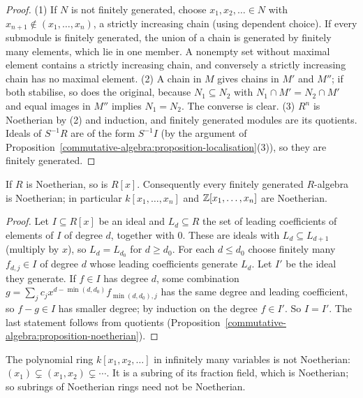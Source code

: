 \begin{proof}
(1) If $N$ is not finitely generated, choose $x_1, x_2, \ldots \in N$ with $x_{n+1} \notin (x_1, \ldots, x_n)$, a strictly
increasing chain (using dependent choice). If every submodule is finitely generated, the union of a chain is
generated by finitely many elements, which lie in one member. A nonempty set without maximal element contains a
strictly increasing chain, and conversely a strictly increasing chain has no maximal element.
(2) A chain in $M$ gives chains in $M'$ and $M''$; if both stabilise, so does the original, because
$N_1 \subseteq N_2$ with $N_1 \cap M' = N_2 \cap M'$ and equal images in $M''$ implies $N_1 = N_2$. The converse is clear.
(3) $R^n$ is Noetherian by (2) and induction, and finitely generated modules are its quotients. Ideals of
$S^{-1}R$ are of the form $S^{-1}I$ (by the argument of Proposition~\ref{commutative-algebra:proposition-localisation}(3)),
so they are finitely generated.
\end{proof}

\begin{theorem}\label{commutative-algebra:theorem-hilbert-basis}
If $R$ is Noetherian, so is $R[x]$. Consequently every finitely generated $R$-algebra is Noetherian; in particular
$k[x_1, \ldots, x_n]$ and $\mathbb{Z}[x_1, \ldots, x_n]$ are Noetherian.
\end{theorem}

\begin{proof}
Let $I \subseteq R[x]$ be an ideal and $L_d \subseteq R$ the set of leading coefficients of elements of $I$ of degree $d$, together
with $0$. These are ideals with $L_d \subseteq L_{d+1}$ (multiply by $x$), so $L_d = L_{d_0}$ for $d \geq d_0$. For each
$d \leq d_0$ choose finitely many $f_{d,j} \in I$ of degree $d$ whose leading coefficients generate $L_d$. Let $I'$ be the
ideal they generate. If $f \in I$ has degree $d$, some combination $g = \sum_j c_jx^{d - \min(d, d_0)}f_{\min(d,d_0), j}$ has
the same degree and leading coefficient, so $f - g \in I$ has smaller degree; by induction on the degree $f \in I'$.
So $I = I'$. The last statement follows from quotients (Proposition~\ref{commutative-algebra:proposition-noetherian}).
\end{proof}

\begin{counterexample}\label{commutative-algebra:counterexample-not-noetherian}
The polynomial ring $k[x_1, x_2, \ldots]$ in infinitely many variables is not Noetherian:
$(x_1) \subsetneq (x_1, x_2) \subsetneq \cdots$. It is a subring of its fraction field, which is Noetherian; so subrings of
Noetherian rings need not be Noetherian.
\end{counterexample}

